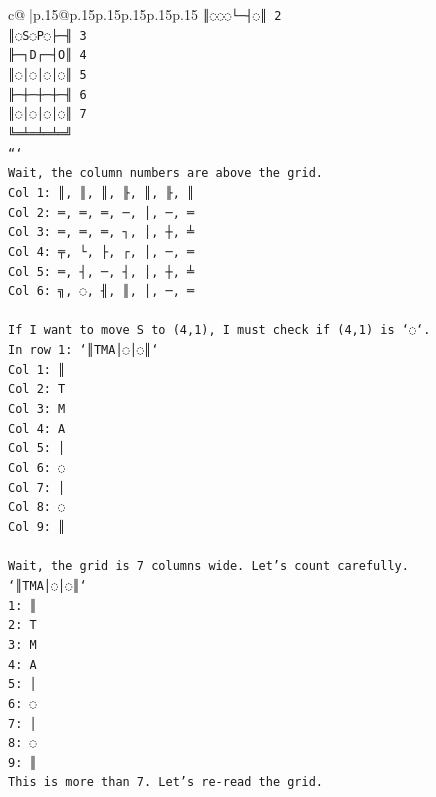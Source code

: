 \documentclass{article}
\begin{document}
{\begin{supertabular}{c@{$\;$}|p{.15\linewidth}@{}p{.15\linewidth}p{.15\linewidth}p{.15\linewidth}p{.15\linewidth}p{.15\linewidth}}
{{{\texttt{║◌◌◌└─┤◌║ 2} \\
\texttt{║◌S◌P◌├─╢ 3} \\
\texttt{╟─┐D┌─┤O║ 4} \\
\texttt{║◌│◌│◌│◌║ 5} \\
\texttt{╟─┼─┼─┼─╢ 6} \\
\texttt{║◌│◌│◌│◌║ 7} \\
\texttt{╚═╧═╧═╧═╝} \\
\texttt{```} \\
\texttt{Wait, the column numbers are above the grid.} \\
\texttt{Col 1: ║, ║, ║, ╟, ║, ╟, ║} \\
\texttt{Col 2: ═, ═, ═, ─, │, ─, ═} \\
\texttt{Col 3: ═, ═, ═, ┐, │, ┼, ╧} \\
\texttt{Col 4: ╤, └, ├, ┌, │, ─, ═} \\
\texttt{Col 5: ═, ┤, ─, ┤, │, ┼, ╧} \\
\texttt{Col 6: ╗, ◌, ╢, ║, │, ─, ═} \\
\\ 
\texttt{If I want to move S to (4,1), I must check if (4,1) is `◌`.} \\
\texttt{In row 1: `║TMA│◌│◌║`} \\
\texttt{Col 1: ║} \\
\texttt{Col 2: T} \\
\texttt{Col 3: M} \\
\texttt{Col 4: A} \\
\texttt{Col 5: │} \\
\texttt{Col 6: ◌} \\
\texttt{Col 7: │} \\
\texttt{Col 8: ◌} \\
\texttt{Col 9: ║} \\
\\ 
\texttt{Wait, the grid is 7 columns wide. Let's count carefully.} \\
\texttt{`║TMA│◌│◌║`} \\
\texttt{1: ║} \\
\texttt{2: T} \\
\texttt{3: M} \\
\texttt{4: A} \\
\texttt{5: │} \\
\texttt{6: ◌} \\
\texttt{7: │} \\
\texttt{8: ◌} \\
\texttt{9: ║} \\
\texttt{This is more than 7. Let's re{-}read the grid.} \\
}}}
\end{supertabular}}
\end{document}
